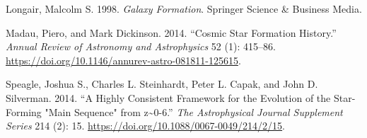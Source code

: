 \documentclass[
]{article}
\newlength{\cslhangindent}
\newenvironment{CSLReferences}[2] %
 {\begin{list}{}{%
  \setlength{\itemindent}{0pt}
  \setlength{\leftmargin}{0pt}
  \setlength{\parsep}{0pt}
  \ifodd #1
   \setlength{\leftmargin}{\cslhangindent}
   \setlength{\itemindent}{-1\cslhangindent}
  \fi
  \setlength{\itemsep}{#2\baselineskip}}}
 {\end{list}}
\begin{document}
\begin{CSLReferences}{1}{0}
Longair, Malcolm S. 1998. \emph{Galaxy Formation}. Springer Science \&
Business Media.

Madau, Piero, and Mark Dickinson. 2014. {``Cosmic Star Formation
History.''} \emph{Annual Review of Astronomy and Astrophysics} 52 (1):
415--86. \url{https://doi.org/10.1146/annurev-astro-081811-125615}.

Speagle, Joshua S., Charles L. Steinhardt, Peter L. Capak, and John D.
Silverman. 2014. {``A {Highly Consistent Framework} for the {Evolution}
of the {Star-Forming} "{Main Sequence}" from z\textasciitilde0-6.''}
\emph{The Astrophysical Journal Supplement Series} 214 (2): 15.
\url{https://doi.org/10.1088/0067-0049/214/2/15}.

\end{CSLReferences}
\end{document}
